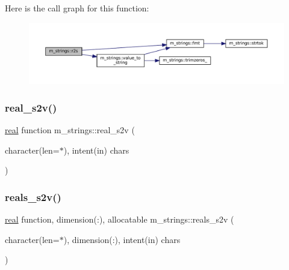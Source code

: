 Here is the call graph for this function\+:\nopagebreak
\begin{figure}[H]
\begin{center}
\leavevmode
\includegraphics[width=350pt]{namespacem__strings_ab67ea90007b3f2eb308a5fe8d1cf0df1_cgraph}
\end{center}
\end{figure}
\mbox{\label{namespacem__strings_aac80fa95c07cf00d5442a88962c5e6e9}} 
\subsubsection{\texorpdfstring{real\+\_\+s2v()}{real\_s2v()}}
{\footnotesize\ttfamily \mbox{\hyperlink{interfacem__strings_1_1real}{real}} function m\+\_\+strings\+::real\+\_\+s2v (\begin{DoxyParamCaption}\item[{character(len=$\ast$), intent(in)}]{chars }\end{DoxyParamCaption})\hspace{0.3cm}{\ttfamily [private]}}

\mbox{\label{namespacem__strings_ac62b68d2aeb2b404a3340101f2cb7f84}} 
\subsubsection{\texorpdfstring{reals\+\_\+s2v()}{reals\_s2v()}}
{\footnotesize\ttfamily \mbox{\hyperlink{interfacem__strings_1_1real}{real}} function, dimension(\+:), allocatable m\+\_\+strings\+::reals\+\_\+s2v (\begin{DoxyParamCaption}\item[{character(len=$\ast$), dimension(\+:), intent(in)}]{chars }\end{DoxyParamCaption})\hspace{0.3cm}{\ttfamily [private]}}

